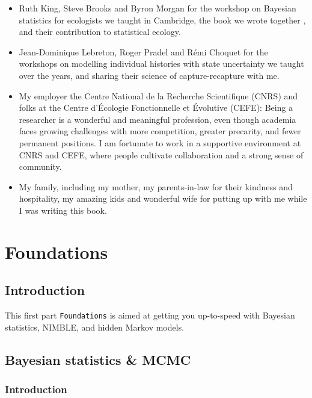 \documentclass[
  12pt,
]{krantz}
\begin{document}
\begin{itemize}
\item
  Ruth King, Steve Brooks and Byron Morgan for the workshop on Bayesian statistics for ecologists we taught in Cambridge, the book we wrote together \citep{king_bayesian_2009}, and their contribution to statistical ecology.\\
\item
  Jean-Dominique Lebreton, Roger Pradel and Rémi Choquet for the workshops on modelling individual histories with state uncertainty we taught over the years, and sharing their science of capture-recapture with me.
\item
  My employer the Centre National de la Recherche Scientifique (CNRS) and folks at the Centre d'Écologie Fonctionnelle et Évolutive (CEFE): Being a researcher is a wonderful and meaningful profession, even though academia faces growing challenges with more competition, greater precarity, and fewer permanent positions. I am fortunate to work in a supportive environment at CNRS and CEFE, where people cultivate collaboration and a strong sense of community.
\item
  My family, including my mother, my parents-in-law for their kindness and hospitality, my amazing kids and wonderful wife for putting up with me while I was writing this book.
\end{itemize}

\mainmatter

\part{Foundations}\label{part-foundations}

\chapter*{Introduction}\label{introduction}


This first part \texttt{Foundations} is aimed at getting you up-to-speed with Bayesian statistics, NIMBLE, and hidden Markov models.

\chapter{Bayesian statistics \& MCMC}\label{crashcourse}

\section{Introduction}\label{introduction-1}
\end{document}
